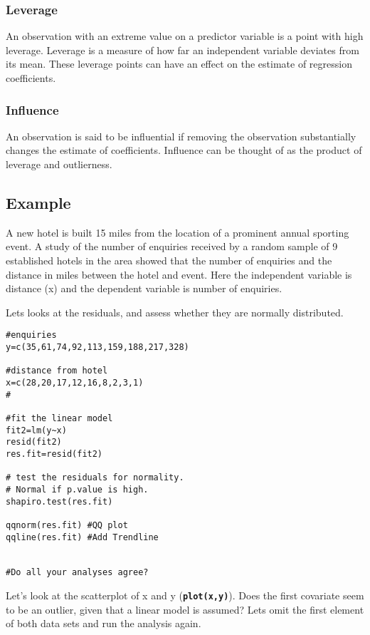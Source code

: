 \documentclass[a4paper,12pt]{article}
\begin{document}
\subsubsection{Leverage}  An observation with an extreme value on a predictor variable is a point with high leverage.  Leverage is a measure of how far an independent variable deviates from its mean.  These leverage points can have an effect on the estimate of regression coefficients.

\subsubsection{Influence} An observation is said to be influential if removing the observation substantially changes the estimate of coefficients.  Influence can be thought of as the product of leverage and outlierness.
\subsection{Example}
A new hotel is built 15 miles from the location of a prominent annual sporting event. A study of the number of enquiries received by a random sample of 9 established hotels in the area showed that the number of enquiries and the distance in miles between the hotel and event. Here the independent variable is distance (x) and the dependent variable is number of enquiries.

Lets looks at the residuals, and assess whether they are normally distributed.

\begin{framed}
\begin{verbatim}
#enquiries
y=c(35,61,74,92,113,159,188,217,328)
 	
#distance from hotel
x=c(28,20,17,12,16,8,2,3,1)	
#

#fit the linear model	
fit2=lm(y~x)					
resid(fit2)
res.fit=resid(fit2)

# test the residuals for normality.
# Normal if p.value is high.
shapiro.test(res.fit)	
	
qqnorm(res.fit)	#QQ plot
qqline(res.fit)	#Add Trendline


#Do all your analyses agree?

\end{verbatim}
\end{framed}
Let’s look at the scatterplot of x and y (\textbf{\texttt{plot(x,y)}}).  Does the first covariate seem to be an outlier, given that a linear model is assumed?
Lets omit the first element of both data sets and run the analysis again.
\end{document}
